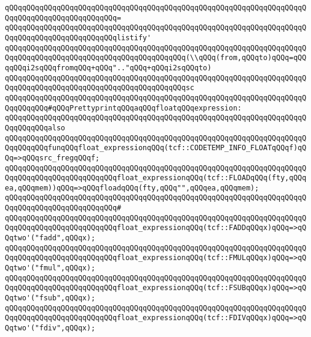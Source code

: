 \verb|qQQqqQQqqQQqqQQqqQQqqQQqqQQqqQQqqQQqqQQqqQQqqQQqqQQqqQQqqQQqqQQqqQQqqQQqqQQqqQQqqQQqqQQqqQQqqQQq=|\newline
\verb|qQQqqQQqqQQqqQQqqQQqqQQqqQQqqQQqqQQqqQQqqQQqqQQqqQQqqQQqqQQqqQQqqQQqqQQqqQQqqQQqqQQqqQQqqQQqqQQqlistify'|\newline
\verb|qQQqqQQqqQQqqQQqqQQqqQQqqQQqqQQqqQQqqQQqqQQqqQQqqQQqqQQqqQQqqQQqqQQqqQQqqQQqqQQqqQQqqQQqqQQqqQQqqQQqqQQqqQQqqQQq(\\qQQq(from,qQQqto)qQQq=qQQqqQQqi2sqQQqfromqQQq+qQQq".."qQQq+qQQqi2sqQQqto)|\newline
\verb|qQQqqQQqqQQqqQQqqQQqqQQqqQQqqQQqqQQqqQQqqQQqqQQqqQQqqQQqqQQqqQQqqQQqqQQqqQQqqQQqqQQqqQQqqQQqqQQqqQQqqQQqqQQqqQQqsc|\newline
\newline
\newline
\verb|qQQqqQQqqQQqqQQqqQQqqQQqqQQqqQQqqQQqqQQqqQQqqQQqqQQqqQQqqQQqqQQqqQQqqQQqqQQqqQQq#qQQqPrettyprintqQQqaqQQqfloatqQQqexpression:|\newline
\verb|qQQqqQQqqQQqqQQqqQQqqQQqqQQqqQQqqQQqqQQqqQQqqQQqqQQqqQQqqQQqqQQqqQQqqQQqqQQqqQQqalso|\newline
\verb|qQQqqQQqqQQqqQQqqQQqqQQqqQQqqQQqqQQqqQQqqQQqqQQqqQQqqQQqqQQqqQQqqQQqqQQqqQQqqQQqfunqQQqfloat_expressionqQQq(tcf::CODETEMP_INFO_FLOATqQQqf)qQQq=>qQQqsrc_fregqQQqf;|\newline
\verb|qQQqqQQqqQQqqQQqqQQqqQQqqQQqqQQqqQQqqQQqqQQqqQQqqQQqqQQqqQQqqQQqqQQqqQQqqQQqqQQqqQQqqQQqqQQqqQQqfloat_expressionqQQq(tcf::FLOADqQQq(fty,qQQqea,qQQqmem))qQQq=>qQQqfloadqQQq(fty,qQQq"",qQQqea,qQQqmem);|\newline
\verb|qQQqqQQqqQQqqQQqqQQqqQQqqQQqqQQqqQQqqQQqqQQqqQQqqQQqqQQqqQQqqQQqqQQqqQQqqQQqqQQqqQQqqQQqqQQqqQQq#|\newline
\verb|qQQqqQQqqQQqqQQqqQQqqQQqqQQqqQQqqQQqqQQqqQQqqQQqqQQqqQQqqQQqqQQqqQQqqQQqqQQqqQQqqQQqqQQqqQQqqQQqfloat_expressionqQQq(tcf::FADDqQQqx)qQQq=>qQQqtwo'("fadd",qQQqx);|\newline
\verb|qQQqqQQqqQQqqQQqqQQqqQQqqQQqqQQqqQQqqQQqqQQqqQQqqQQqqQQqqQQqqQQqqQQqqQQqqQQqqQQqqQQqqQQqqQQqqQQqfloat_expressionqQQq(tcf::FMULqQQqx)qQQq=>qQQqtwo'("fmul",qQQqx);|\newline
\verb|qQQqqQQqqQQqqQQqqQQqqQQqqQQqqQQqqQQqqQQqqQQqqQQqqQQqqQQqqQQqqQQqqQQqqQQqqQQqqQQqqQQqqQQqqQQqqQQqfloat_expressionqQQq(tcf::FSUBqQQqx)qQQq=>qQQqtwo'("fsub",qQQqx);|\newline
\verb|qQQqqQQqqQQqqQQqqQQqqQQqqQQqqQQqqQQqqQQqqQQqqQQqqQQqqQQqqQQqqQQqqQQqqQQqqQQqqQQqqQQqqQQqqQQqqQQqfloat_expressionqQQq(tcf::FDIVqQQqx)qQQq=>qQQqtwo'("fdiv",qQQqx);|\newline
